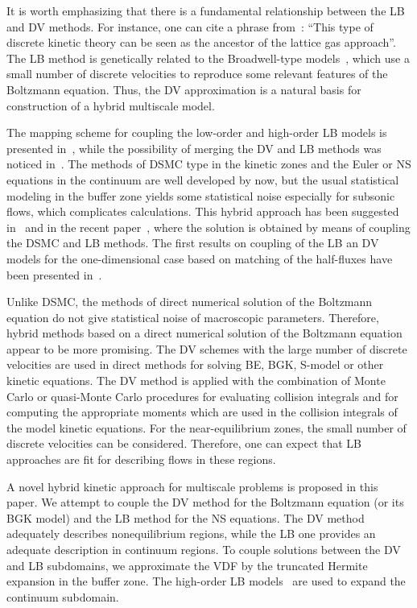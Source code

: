 \documentclass{elsarticle} %
\begin{document}
It is worth emphasizing that there is a fundamental relationship between the LB and DV methods.
For instance, one can cite a phrase from~\cite{Rivet2001}:
``This type of discrete kinetic theory can be seen as the ancestor of the lattice gas approach''.
The LB method is genetically related to the Broadwell-type models~\cite{Broadwell1964shock, Gatignol1975},
which use a small number of discrete velocities to reproduce some relevant features of the Boltzmann equation.
Thus, the DV approximation is a natural basis for construction of a hybrid multiscale model.

The mapping scheme for coupling the low-order and high-order LB models is presented in~\cite{Meng2011},
while the possibility of merging the DV and LB methods was noticed in~\cite{Succi2016}.
The methods of DSMC type in the kinetic zones and the Euler or NS equations in the continuum are well developed by now,
but the usual statistical modeling in the buffer zone yields some statistical noise especially for subsonic flows,
which complicates calculations.
This hybrid approach has been suggested in~\cite{Staso2016short, Staso2016long} and in the recent paper~\cite{Staso2018},
where the solution is obtained by means of coupling the DSMC and LB methods.
The first results on coupling of the LB an DV models for the one-dimensional case
based on matching of the half-fluxes have been presented in~\cite{Ilyin2018}.

Unlike DSMC, the methods of direct numerical solution of the Boltzmann equation do not give statistical noise of macroscopic parameters.
Therefore, hybrid methods based on a direct numerical solution of the Boltzmann equation appear to be more promising.
The DV schemes with the large number of discrete velocities are used in direct methods for solving BE, BGK, S-model or other kinetic equations.
The DV method is applied with the combination of Monte Carlo or quasi-Monte Carlo procedures for evaluating collision integrals
and for computing the appropriate moments which are used in the collision integrals of the model kinetic equations.
For the near-equilibrium zones, the small number of discrete velocities can be considered.
Therefore, one can expect that LB approaches are fit for describing flows in these regions.

A novel hybrid kinetic approach for multiscale problems is proposed in this paper.
We attempt to couple the DV method for the Boltzmann equation (or its BGK model) and the LB method for the NS equations.
The DV method adequately describes nonequilibrium regions, while the LB one provides an adequate description in continuum regions.
To couple solutions between the DV and LB subdomains, we approximate the VDF by the truncated Hermite expansion in the buffer zone.
The high-order LB models~\cite{Shan2006, Feuchter2016}
are used to expand the continuum subdomain.
\end{document}
